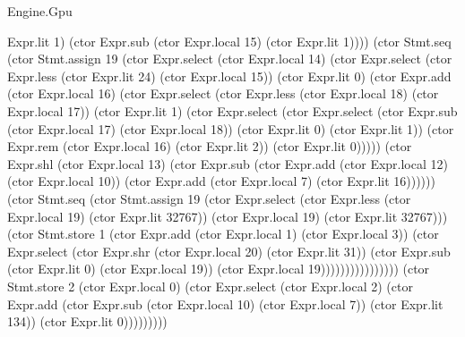 \begin{lexlean}{Engine.Gpu}
\begin{semanticmodule}
{Expr.lit 1) (ctor Expr.sub (ctor Expr.local 15) (ctor Expr.lit 1)))) (ctor Stmt.seq (ctor Stmt.assign 19 (ctor Expr.select (ctor Expr.local 14) (ctor Expr.select (ctor Expr.less (ctor Expr.lit 24) (ctor Expr.local 15)) (ctor Expr.lit 0) (ctor Expr.add (ctor Expr.local 16) (ctor Expr.select (ctor Expr.less (ctor Expr.local 18) (ctor Expr.local 17)) (ctor Expr.lit 1) (ctor Expr.select (ctor Expr.select (ctor Expr.sub (ctor Expr.local 17) (ctor Expr.local 18)) (ctor Expr.lit 0) (ctor Expr.lit 1)) (ctor Expr.rem (ctor Expr.local 16) (ctor Expr.lit 2)) (ctor Expr.lit 0))))) (ctor Expr.shl (ctor Expr.local 13) (ctor Expr.sub (ctor Expr.add (ctor Expr.local 12) (ctor Expr.local 10)) (ctor Expr.add (ctor Expr.local 7) (ctor Expr.lit 16)))))) (ctor Stmt.seq (ctor Stmt.assign 19 (ctor Expr.select (ctor Expr.less (ctor Expr.local 19) (ctor Expr.lit 32767)) (ctor Expr.local 19) (ctor Expr.lit 32767))) (ctor Stmt.store 1 (ctor Expr.add (ctor Expr.local 1) (ctor Expr.local 3)) (ctor Expr.select (ctor Expr.shr (ctor Expr.local 20) (ctor Expr.lit 31)) (ctor Expr.sub (ctor Expr.lit 0) (ctor Expr.local 19)) (ctor Expr.local 19)))))))))))))))) (ctor Stmt.store 2 (ctor Expr.local 0) (ctor Expr.select (ctor Expr.local 2) (ctor Expr.add (ctor Expr.sub (ctor Expr.local 10) (ctor Expr.local 7)) (ctor Expr.lit 134)) (ctor Expr.lit 0)))))))))
}


\end{semanticmodule}
\end{lexlean}
